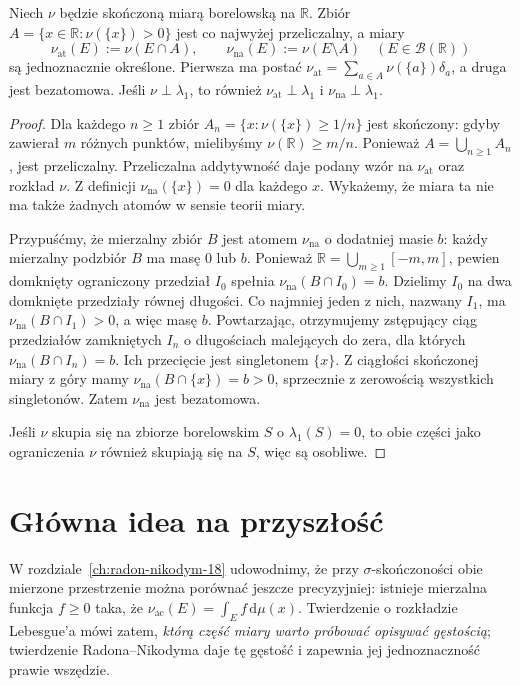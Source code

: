 \begin{twierdzenie}
\label{thm:atomic-cont-singular-17}
Niech $\nu$ będzie skończoną miarą borelowską na
$\mathbb R$. Zbiór
$A=\{x\in\mathbb R:\nu(\{x\})>0\}$ jest co najwyżej
przeliczalny, a miary
\[
 \nu_{\mathrm{at}}(E):=\nu(E\cap A),\qquad
 \nu_{\mathrm{na}}(E):=\nu(E\setminus A)
 \quad(E\in\mathcal B(\mathbb R))
\]
są jednoznacznie określone. Pierwsza ma postać
$\nu_{\mathrm{at}}=\sum_{a\in A}\nu(\{a\})\delta_a$,
a druga jest bezatomowa. Jeśli $\nu\perp\lambda_1$,
to również $\nu_{\mathrm{at}}\perp\lambda_1$ i
$\nu_{\mathrm{na}}\perp\lambda_1$.
\end{twierdzenie}
\begin{proof}
Dla każdego $n\ge1$ zbiór
$A_n=\{x:\nu(\{x\})\ge1/n\}$ jest skończony:
gdyby zawierał $m$ różnych punktów, mielibyśmy
$\nu(\mathbb R)\ge m/n$. Ponieważ
$A=\bigcup_{n\ge1}A_n$, jest przeliczalny.
Przeliczalna addytywność daje podany wzór na
$\nu_{\mathrm{at}}$ oraz rozkład $\nu$.
Z definicji $\nu_{\mathrm{na}}(\{x\})=0$ dla
każdego $x$. Wykażemy, że miara ta nie ma także
żadnych atomów w sensie teorii miary.

Przypuśćmy, że mierzalny zbiór $B$ jest atomem
$\nu_{\mathrm{na}}$ o dodatniej masie $b$:
każdy mierzalny podzbiór $B$ ma masę $0$ lub $b$.
Ponieważ $\mathbb R=\bigcup_{m\ge1}[-m,m]$,
pewien domknięty ograniczony przedział $I_0$
spełnia $\nu_{\mathrm{na}}(B\cap I_0)=b$.
Dzielimy $I_0$ na dwa domknięte przedziały równej
długości. Co najmniej jeden z nich, nazwany $I_1$,
ma $\nu_{\mathrm{na}}(B\cap I_1)>0$, a więc masę $b$.
Powtarzając, otrzymujemy zstępujący ciąg przedziałów
zamkniętych $I_n$ o długościach malejących do zera,
dla których $\nu_{\mathrm{na}}(B\cap I_n)=b$.
Ich przecięcie jest singletonem $\{x\}$.
Z ciągłości skończonej miary z góry mamy
$\nu_{\mathrm{na}}(B\cap\{x\})=b>0$,
sprzecznie z zerowością wszystkich singletonów.
Zatem $\nu_{\mathrm{na}}$ jest bezatomowa.

Jeśli $\nu$ skupia się na zbiorze borelowskim $S$
o $\lambda_1(S)=0$, to obie części jako ograniczenia
$\nu$ również skupiają się na $S$, więc są osobliwe.
\end{proof}

\section{Główna idea na przyszłość}
W rozdziale~\ref{ch:radon-nikodym-18} udowodnimy, że przy
$\sigma$-skończoności obie mierzone przestrzenie można porównać
jeszcze precyzyjniej: istnieje mierzalna funkcja
$f\ge0$ taka, że
$\nu_{\mathrm{ac}}(E)=\int_E f\,\mathrm d\mu(x)$.
Twierdzenie o rozkładzie Lebesgue'a mówi zatem,
\emph{którą część miary warto próbować opisywać gęstością};
twierdzenie Radona--Nikodyma daje tę gęstość i
zapewnia jej jednoznaczność prawie wszędzie.
